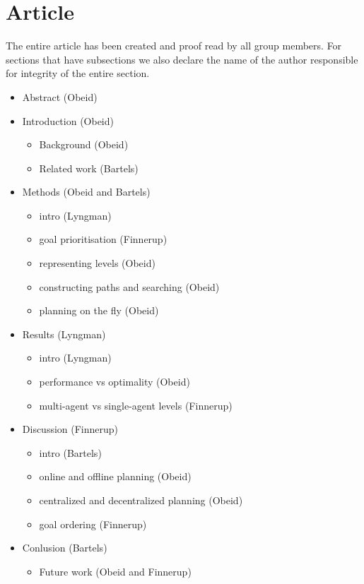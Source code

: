 \documentclass[a4paper]{article}
\newcommand{\jens}{Finnerup}
\newcommand{\sune}{Bartels}
\newcommand{\superdude}{Lyngman}
\newcommand{\elias}{Obeid}
\begin{document}
\section{Article}
The entire article has been created and proof read by all group members.
For sections that have subsections we also declare the name of the author responsible for integrity of the entire section.
\begin{itemize}
  \item Abstract (\elias)
  \item Introduction (\elias)
    \begin{itemize}
      \item Background (\elias)
      \item Related work (\sune)
    \end{itemize}
  \item Methods (\elias{} and \sune)
    \begin{itemize}
      \item intro (\superdude)
      \item goal prioritisation (\jens)
      \item representing levels (\elias)
      \item constructing paths and searching (\elias)
      \item planning on the fly (\elias)
    \end{itemize}
  \item Results (\superdude)
    \begin{itemize}
      \item intro (\superdude)
      \item performance vs optimality (\elias)
      \item multi-agent vs single-agent levels (\jens)
    \end{itemize}
  \item Discussion (\jens)
    \begin{itemize}
      \item intro (\sune)
      \item online and offline planning (\elias)
      \item centralized and decentralized planning (\elias)
      \item goal ordering (\jens)
    \end{itemize}
  \item Conlusion (\sune)
    \begin{itemize}
      \item Future work (\elias{} and \jens)
    \end{itemize}
\end{itemize}
\end{document}
